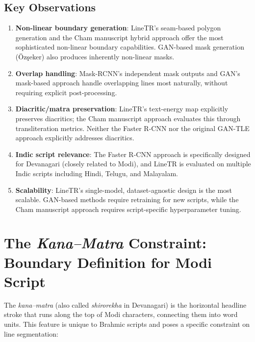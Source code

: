 \documentclass[11pt, a4paper]{article}
\begin{document}
\subsection{Key Observations}

\begin{enumerate}[leftmargin=1.5em]
    \item \textbf{Non-linear boundary generation}: LineTR's seam-based polygon generation and the Cham manuscript hybrid approach offer the most sophisticated non-linear boundary capabilities. GAN-based mask generation (\"Oz\c{s}eker) also produces inherently non-linear masks.
    
    \item \textbf{Overlap handling}: Mask-RCNN's independent mask outputs and GAN's mask-based approach handle overlapping lines most naturally, without requiring explicit post-processing.
    
    \item \textbf{Diacritic/matra preservation}: LineTR's text-energy map explicitly preserves diacritics; the Cham manuscript approach evaluates this through transliteration metrics. Neither the Faster R-CNN nor the original GAN-TLE approach explicitly addresses diacritics.
    
    \item \textbf{Indic script relevance}: The Faster R-CNN approach is specifically designed for Devanagari (closely related to Modi), and LineTR is evaluated on multiple Indic scripts including Hindi, Telugu, and Malayalam.
    
    \item \textbf{Scalability}: LineTR's single-model, dataset-agnostic design is the most scalable. GAN-based methods require retraining for new scripts, while the Cham manuscript approach requires script-specific hyperparameter tuning.
\end{enumerate}


\section{The \textit{Kana--Matra} Constraint: Boundary Definition for Modi Script}
\label{sec:kana_matra}

The \textit{kana--matra} (also called \textit{shirorekha} in Devanagari) is the horizontal headline stroke that runs along the top of Modi characters, connecting them into word units. This feature is unique to Brahmic scripts and poses a specific constraint on line segmentation:
\end{document}

